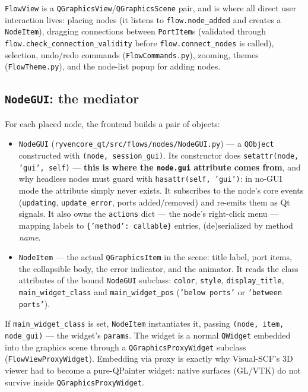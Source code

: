 \documentclass[10pt,a4paper]{article}
\newcommand{\code}[1]{\texttt{\small #1}}
\begin{document}
\code{FlowView} is a \code{QGraphicsView}/\code{QGraphicsScene} pair, and is where all
direct user interaction lives: placing nodes (it listens to \code{flow.node\_added} and
creates a \code{NodeItem}), dragging connections between \code{PortItem}s (validated
through \code{flow.check\_connection\_validity} before
\code{flow.connect\_nodes} is called), selection, undo/redo commands
(\code{FlowCommands.py}), zooming, themes (\code{FlowTheme.py}), and the node-list
popup for adding nodes.

\subsection{\texttt{NodeGUI}: the mediator}

For each placed node, the frontend builds a pair of objects:

\begin{itemize}
\item \code{NodeGUI} (\code{ryvencore\_qt/src/flows/nodes/NodeGUI.py}) --- a
      \code{QObject} constructed with \code{(node, session\_gui)}. Its constructor does
      \code{setattr(node, 'gui', self)} --- \textbf{this is where the
      \code{node.gui} attribute comes from}, and why headless nodes must guard with
      \code{hasattr(self, 'gui')}: in no-GUI mode the attribute simply never exists.
      It subscribes to the node's core events (\code{updating},
      \code{update\_error}, ports added/removed) and re-emits them as Qt signals.
      It also owns the \code{actions} dict --- the node's right-click menu ---
      mapping labels to \code{\{'method': callable\}} entries, (de)serialized by
      method \emph{name}.
\item \code{NodeItem} --- the actual \code{QGraphicsItem} in the scene: title label,
      port items, the collapsible body, the error indicator, and the animator. It
      reads the class attributes of the bound \code{NodeGUI} subclass:
      \code{color}, \code{style}, \code{display\_title},
      \code{main\_widget\_class} and \code{main\_widget\_pos}
      (\code{'below ports'} or \code{'between ports'}).
\end{itemize}

If \code{main\_widget\_class} is set, \code{NodeItem} instantiates it, passing
\code{(node, item, node\_gui)} --- the widget's \code{params}. The widget is a normal
\code{QWidget} embedded into the graphics scene through a
\code{QGraphicsProxyWidget} subclass (\code{FlowViewProxyWidget}). Embedding via proxy
is exactly why Visual-SCF's 3D viewer had to become a pure-QPainter widget: native
surfaces (GL/VTK) do not survive inside \code{QGraphicsProxyWidget}.
\end{document}
